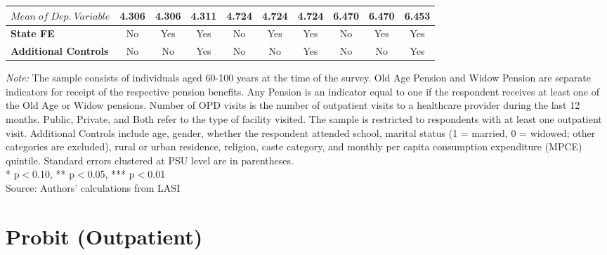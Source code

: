 \documentclass[
  11pt,
]{article}
\begin{document}
\begin{table}[H]
{\begin{tabular}{lccccccccc}
\textbf{\(Mean\; of\; Dep.\; Variable\)} & 4.306 & 4.306 & 4.311 & 4.724 & 4.724 & 4.724 & 6.470 & 6.470 & 6.453 \\
\midrule
\textbf{State FE} & No & Yes & Yes & No & Yes & Yes & No & Yes & Yes \\
\textbf{Additional Controls} & No & No & Yes & No & No & Yes & No & No & Yes \\
\bottomrule
\end{tabular}
}
\vspace{2mm}
\begin{minipage}{0.95\textwidth}
\footnotesize \textit{Note:} The sample consists of individuals aged 60-100 years at the time of the survey. Old Age Pension and Widow Pension are separate indicators for receipt of the respective pension benefits. Any Pension is an indicator equal to one if the respondent receives at least one of the Old Age or Widow pensions. Number of OPD visits is the number of outpatient visits to a healthcare provider during the last 12 months. Public, Private, and Both refer to the type of facility visited. The sample is restricted to respondents with at least one outpatient visit. Additional Controls include age, gender, whether the respondent attended school, marital status (1 = married, 0 = widowed; other categories are excluded), rural or urban residence, religion, caste category, and monthly per capita consumption expenditure (MPCE) quintile. Standard errors clustered at PSU level are in parentheses. \\ * p$<$0.10, ** p$<$0.05, *** p$<$0.01\\
Source: Authors' calculations from LASI
\end{minipage}
\end{table}

\section{Probit (Outpatient)}\label{probit-outpatient}
\end{document}

